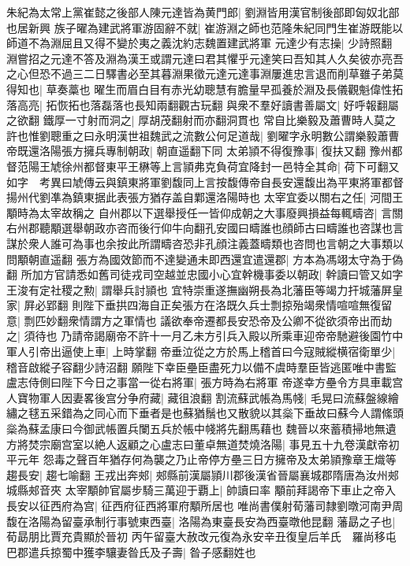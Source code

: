 朱紀為太常上黨崔懿之後部人陳元達皆為黄門郎|{
	劉淵皆用漢官制後部即匈奴北部也居新興}
族子曜為建武將軍游固辭不就|{
	崔游淵之師也范隆朱紀同門生崔游既能以師道不為淵屈且又得不變於夷之義沈約志魏置建武將軍}
元達少有志操|{
	少詩照翻}
淵嘗招之元達不答及淵為漢王或謂元達曰君其懼乎元達笑曰吾知其人久矣彼亦亮吾之心但恐不過三二日驛書必至其暮淵果徵元達元達事淵屢進忠言退而削草雖子弟莫得知也|{
	草奏藁也}
曜生而眉白目有赤光幼聰慧有膽量早孤養於淵及長儀觀魁偉性拓落高亮|{
	拓恢拓也落磊落也長知兩翻觀古玩翻}
與衆不羣好讀書善屬文|{
	好呼報翻屬之欲翻}
鐵厚一寸射而洞之|{
	厚胡茂翻射而亦翻洞貫也}
常自比樂毅及蕭曹時人莫之許也惟劉聰重之曰永明漢世祖魏武之流數公何足道哉|{
	劉曜字永明數公謂樂毅蕭曹}
帝既還洛陽張方擁兵專制朝政|{
	朝直遥翻下同}
太弟頴不得復豫事|{
	復扶又翻}
豫州都督范陽王虓徐州都督東平王楙等上言頴弗克負荷宜降封一邑特全其命|{
	荷下可翻又如字　考異曰虓傳云與鎮東將軍劉馥同上言按馥傳帝自長安還馥出為平東將軍都督揚州代劉凖為鎮東据此表張方猶存盖自鄴還洛陽時也}
太宰宜委以關右之任|{
	河間王顒時為太宰故稱之}
自州郡以下選舉授任一皆仰成朝之大事廢興損益每輒疇咨|{
	言關右州郡聽顒選舉朝政亦咨而後行仰牛向翻孔安國曰疇誰也顔師古曰疇誰也咨謀也言謀於衆人誰可為事也余按此所謂疇咨恐非孔顔注義蓋疇類也咨問也言朝之大事類以問顒朝直遥翻}
張方為國效節而不達變通未即西還宜遣還郡|{
	方本為馮翊太守為于偽翻}
所加方官請悉如舊司徒戎司空越並忠國小心宜幹機事委以朝政|{
	幹讀曰管又如字}
王浚有定社稷之勲|{
	謂舉兵討頴也}
宜特崇重遂撫幽朔長為北藩臣等竭力扞城藩屏皇家|{
	屛必郢翻}
則陛下垂拱四海自正矣張方在洛既久兵士剽掠殆竭衆情喧喧無復留意|{
	剽匹妙翻衆情謂方之軍情也}
議欲奉帝遷都長安恐帝及公卿不從欲須帝出而劫之|{
	須待也}
乃請帝謁廟帝不許十一月乙未方引兵入殿以所乘車迎帝帝馳避後園竹中軍人引帝出逼使上車|{
	上時掌翻}
帝垂泣從之方於馬上稽首曰今寇賊縱横宿衛單少|{
	稽音啟縱子容翻少詩沼翻}
願陛下幸臣壘臣盡死力以備不虞時羣臣皆逃匿唯中書監盧志侍側曰陛下今日之事當一從右將軍|{
	張方時為右將軍}
帝遂幸方壘令方具車載宫人寶物軍人因妻畧後宫分争府藏|{
	藏徂浪翻}
割流蘇武帳為馬帴|{
	毛晃曰流蘇盤線繪繡之毬五采錯為之同心而下垂者是也蘇猶鬚也又散貌以其橤下垂故曰蘇今人謂絛頭橤為蘇孟康曰今御武帳置兵闌五兵於帳中帴將先翻馬藉也}
魏晉以來蓄積掃地無遺方將焚宗廟宫室以絶人返顧之心盧志曰董卓無道焚燒洛陽|{
	事見五十九卷漢獻帝初平元年}
怨毒之聲百年猶存何為襲之乃止帝停方壘三日方擁帝及太弟頴豫章王熾等趨長安|{
	趨七喻翻}
王戎出奔郟|{
	郟縣前漢屬頴川郡後漢省晉屬襄城郡隋唐為汝州郟城縣郟音夾}
太宰顒帥官屬步騎三萬迎于覇上|{
	帥讀曰率}
顒前拜謁帝下車止之帝入長安以征西府為宫|{
	征西府征西將軍府顒所居也}
唯尚書僕射荀藩司隸劉暾河南尹周馥在洛陽為留臺承制行事號東西臺|{
	洛陽為東臺長安為西臺暾他昆翻}
藩勗之子也|{
	荀勗朋比賈充貴顯於晉初}
丙午留臺大赦改元復為永安辛丑復皇后羊氏　羅尚移屯巴郡遣兵掠蜀中獲李驤妻昝氏及子壽|{
	昝子感翻姓也}

